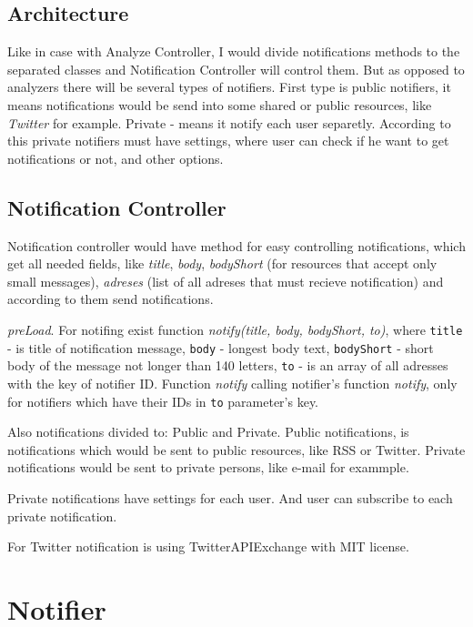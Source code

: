 \section{Architecture}

Like in case with Analyze Controller, I would divide notifications methods to the separated classes and Notification Controller will control them. But as opposed to analyzers there will be several types of notifiers. First type is public notifiers, it means notifications would be send into some shared or public resources, like \emph{Twitter} for example. Private - means it notify each user separetly. According to this private notifiers must have settings, where user can check if he want to get notifications or not, and other options.

\section{Notification Controller}

Notification controller would have method for easy controlling notifications, which get all needed fields, like \emph{title}, \emph{body}, \emph{bodyShort} (for resources that accept only small messages), \emph{adreses} (list of all adreses that must recieve notification) and according to them send notifications. 

\emph{preLoad}. For notifing exist function \emph{notify(title, body, bodyShort, to)}, where \texttt{title} - is title of notification message, \texttt{body} - longest body text, \texttt{bodyShort} - short body of the message not longer than 140 letters, \texttt{to} - is an array of all adresses with the key of notifier ID. Function \emph{notify} calling notifier's function \emph{notify}, only for notifiers which have their IDs in \texttt{to} parameter's key.

Also notifications divided to: Public and Private. Public notifications, is notifications which would be sent to public resources, like RSS or Twitter. Private notifications would be sent to private persons, like e-mail for exammple.

Private notifications have settings for each user. And user can subscribe to each private notification.

For Twitter notification is using TwitterAPIExchange with MIT license.

\chapter{Notifier}

